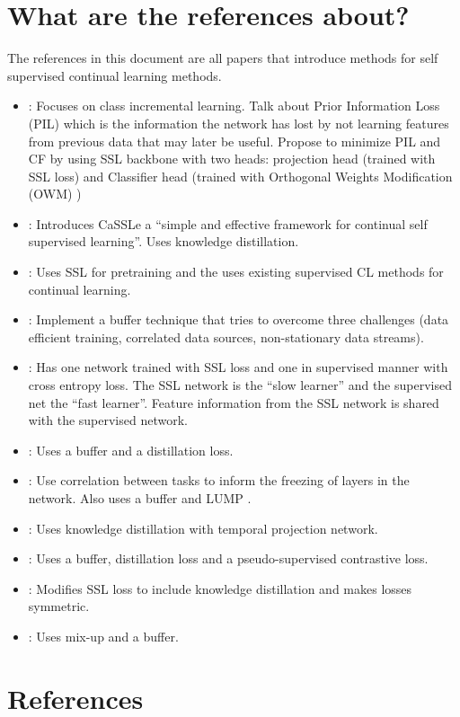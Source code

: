 \documentclass{article}
\author{by Henry Bourne}
\date{\today}
\newcommand{\setfoldernameastitle}{%
  \begingroup
  \edef\x{\endgroup\noexpand\title{\currfilebase}}\x
}
\begin{document}
\setfoldernameastitle %

\maketitle

\section{What are the references about?}
The references in this document are all papers that introduce methods for self supervised continual learning methods. 

\begin{itemize}
  \item \cite{zhang2020self}: Focuses on class incremental learning. Talk about Prior Information Loss (PIL) which is the information the network has lost by not learning features from previous data that may later be useful. Propose to minimize PIL and CF by using SSL backbone with two heads: projection head (trained with SSL loss) and Classifier head (trained with Orthogonal Weights Modification (OWM) \cite{shen2021generative})
  \item \cite{fini2022self}: Introduces CaSSLe a ``simple and effective framework for continual self supervised learning''. Uses knowledge distillation.
  \item \cite{gallardo2021self}: Uses SSL for pretraining and the uses existing supervised CL methods for continual learning.
  \item \cite{purushwalkam2022challenges}: Implement a buffer technique that tries to overcome three challenges (data efficient training, correlated data sources, non-stationary data streams).
  \item \cite{pham2021dualnet}: Has one network trained with SSL loss and one in supervised manner with cross entropy loss. The SSL network is the ``slow learner'' and the supervised net the ``fast learner''. Feature information from the SSL network is shared with the supervised network.
  \item \cite{cha2021co2l}: Uses a buffer and a distillation loss. 
  \item \cite{yang2023efficient}: Use correlation between tasks to inform the freezing of layers in the network. Also uses a buffer and LUMP \cite{madaan2021representational}.
  \item \cite{gomez2022continually}: Uses knowledge distillation with temporal projection network.
  \item \cite{yu2023scale}: Uses a buffer, distillation loss and a pseudo-supervised contrastive loss.
  \item \cite{cha2023sy}: Modifies SSL loss to include knowledge distillation and makes losses symmetric.
  \item \cite{madaan2021representational}: Uses mix-up and a buffer. 
\end{itemize}

\section{References}
\end{document}

